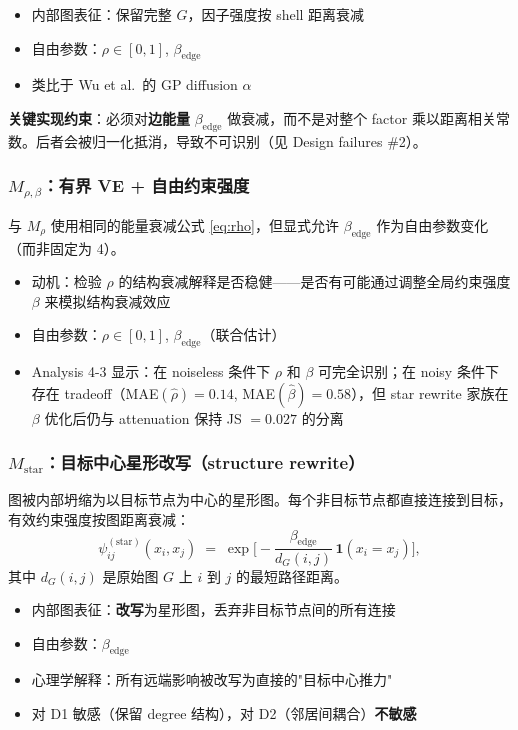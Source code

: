 \documentclass[11pt,a4paper]{ctexart}
\begin{document}
\begin{itemize}
    \item 内部图表征：保留完整 $G$，因子强度按 shell 距离衰减
    \item 自由参数：$\rho\in[0,1]$, $\beta_\mathrm{edge}$
    \item 类比于 Wu et al.\ 的 GP diffusion $\alpha$
\end{itemize}

\textbf{关键实现约束}：必须对\textbf{边能量} $\beta_\mathrm{edge}$ 做衰减，而不是对整个 factor 乘以距离相关常数。后者会被归一化抵消，导致不可识别（见 Design failures \#2）。

\subsubsection{$M_{\rho,\beta}$：有界 VE + 自由约束强度}

与 $M_\rho$ 使用相同的能量衰减公式 \eqref{eq:rho}，但显式允许 $\beta_\mathrm{edge}$ 作为自由参数变化（而非固定为 4）。

\begin{itemize}
    \item 动机：检验 $\rho$ 的结构衰减解释是否稳健——是否有可能通过调整全局约束强度 $\beta$ 来模拟结构衰减效应
    \item 自由参数：$\rho\in[0,1]$, $\beta_\mathrm{edge}$（联合估计）
    \item Analysis 4-3 显示：在 noiseless 条件下 $\rho$ 和 $\beta$ 可完全识别；在 noisy 条件下存在 tradeoff（MAE$(\hat\rho)=0.14$, MAE$(\hat\beta)=0.58$），但 star rewrite 家族在 $\beta$ 优化后仍与 attenuation 保持 JS $=0.027$ 的分离
\end{itemize}

\subsubsection{$M_\mathrm{star}$：目标中心星形改写（structure rewrite）}

图被内部坍缩为以目标节点为中心的星形图。每个非目标节点都直接连接到目标，有效约束强度按图距离衰减：
\begin{equation}
\label{eq:star}
\psi^{(\mathrm{star})}_{ij}(x_i,x_j)
\;=\;
\exp\!\biggl[-\frac{\beta_\mathrm{edge}}{d_G(i,j)}\,\mathbf{1}(x_i=x_j)\biggr],
\end{equation}
其中 $d_G(i,j)$ 是原始图 $G$ 上 $i$ 到 $j$ 的最短路径距离。

\begin{itemize}
    \item 内部图表征：\textbf{改写}为星形图，丢弃非目标节点间的所有连接
    \item 自由参数：$\beta_\mathrm{edge}$
    \item 心理学解释：所有远端影响被改写为直接的"目标中心推力"
    \item 对 D1 敏感（保留 degree 结构），对 D2（邻居间耦合）\textbf{不敏感}
\end{itemize}
\end{document}
